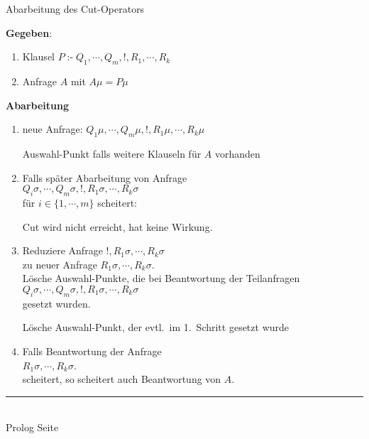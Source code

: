 \documentclass{slides}
\newcommand{\myrule}{\rule{20cm}{1mm}\\ }
\newcounter{mypage}
\begin{document}
\begin{slide}{}
\normalsize
\begin{center}
Abarbeitung des Cut-Operators
\end{center}
\vspace{0.5cm}

\footnotesize
\textbf{Gegeben}: 
\begin{enumerate}
\item Klausel $P \;\texttt{:-}\; Q_1, \cdots, Q_m, \texttt{!}, R_1, \cdots, R_k$ 
\item Anfrage $A$ mit $A\mu = P\mu$
\end{enumerate}
\textbf{Abarbeitung}
\begin{enumerate}
\item neue Anfrage:  $Q_1\mu, \cdots, Q_m\mu, \texttt{!}, R_1\mu, \cdots, R_k\mu$ 

      Auswahl-Punkt falls weitere Klauseln f\"{u}r $A$ vorhanden
\item Falls sp\"{a}ter Abarbeitung von Anfrage  \\[0.3cm]
      \hspace*{1.3cm} 
      $Q_i\sigma, \cdots, Q_m\sigma, \texttt{!}, R_1\sigma, \cdots, R_k\sigma$ \\[0.3cm]
      f\"{u}r  $i\in\{1,\cdots,m\}$ scheitert:

       Cut wird nicht erreicht, hat keine Wirkung.
\item Reduziere Anfrage $\texttt{!}, R_1\sigma, \cdots, R_k\sigma$ \\[0.3cm]
      zu neuer Anfrage $R_1\sigma, \cdots, R_k\sigma$. \\[0.3cm]
      L\"{o}sche  Auswahl-Punkte, die bei Beantwortung der Teilanfragen \\[0.1cm]
      \hspace*{1.3cm} $Q_i\sigma, \cdots, Q_m\sigma, \texttt{!}, R_1\sigma, \cdots, R_k\sigma$ \\[0.3cm]
      gesetzt wurden.

      L\"{o}sche Auswahl-Punkt, der evtl.~im 1.~Schritt gesetzt wurde
\item Falls  Beantwortung der Anfrage \\[0.3cm]
      \hspace*{1.3cm} $R_1\sigma, \cdots, R_k\sigma$. \\[0.3cm]
      scheitert, so scheitert auch Beantwortung von  $A$.
\end{enumerate}

\vspace*{\fill}
\tiny \addtocounter{mypage}{1}
\myrule
Prolog  \hspace*{\fill} Seite 
\end{slide}
\end{document}

